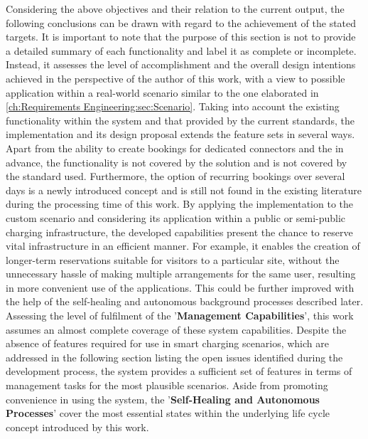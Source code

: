 \noindent Considering the above objectives and their relation to the current output, the following conclusions can be drawn with regard to the achievement of the stated targets. It is important to note that the purpose of this section is not to provide a detailed summary of each functionality and label it as complete or incomplete. 
Instead, it assesses the level of accomplishment and the overall design intentions achieved in the perspective of the author of this work, with a view to possible application within a real-world scenario similar to the one elaborated in \ref{ch:Requirements Engineering:sec:Scenario}.
Taking into account the existing functionality within the system and that provided by the current standards, the implementation and its design proposal extends the feature sets in several ways.
Apart from the ability to create bookings for dedicated connectors and the  in advance, the functionality is not covered by the solution and is not covered by the standard used.
Furthermore, the option of recurring bookings over several days is a newly introduced concept and is still not found in the existing literature during the processing time of this work.
By applying the implementation to the custom scenario and considering its application within a public or semi-public charging infrastructure, the developed capabilities present the chance to reserve vital infrastructure in an efficient manner.
For example, it enables the creation of longer-term reservations suitable for visitors to a particular site, without the unnecessary hassle of making multiple arrangements for the same user, resulting in more convenient use of the applications. This could be further improved with the help of the self-healing and autonomous background processes described later.
Assessing the level of fulfilment of the '\textbf{Management Capabilities}', this work assumes an almost complete coverage of these system capabilities. 
Despite the absence of features required for use in smart charging scenarios, which are addressed in the following section listing the open issues identified during the development process, the system provides a sufficient set of features in terms of management tasks for the most plausible scenarios.
Aside from promoting convenience in using the system, the '\textbf{Self-Healing and Autonomous Processes}' cover the most essential states within the underlying life cycle concept introduced by this work.
